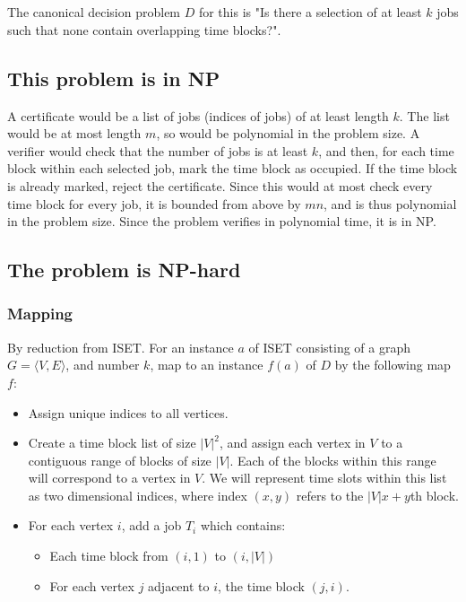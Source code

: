 \documentclass[11pt]{article}
\begin{document}
\section{}
The canonical decision problem $D$ for this is "Is there a selection of at least $k$ jobs such that none contain overlapping time blocks?". 

\subsection*{This problem is in NP}

A certificate would be a list of jobs (indices of jobs) of at least length $k$. The list would be at most length $m$, so would be polynomial in the problem size. A verifier would check that the number of jobs is at least $k$, and then, for each time block within each selected job, mark the time block as occupied. If the time block is already marked, reject the certificate. Since this would at most check every time block for every job, it is bounded from above by $mn$, and is thus polynomial in the problem size. Since the problem verifies in polynomial time, it is in NP.

\subsection*{The problem is NP-hard}

\subsubsection*{Mapping}
By reduction from ISET. For an instance $a$ of ISET consisting of a graph $G = \langle V,E \rangle$, and number $k$, map to an instance $f(a)$ of $D$ by the following map $f$:

\begin{itemize}
    \item Assign unique indices to all vertices. 
    \item Create a time block list of size $|V|^2$, and assign each vertex in $V$ to a contiguous range of blocks of size $|V|$. Each of the blocks within this range will correspond to a vertex in $V$. We will represent time slots within this list as two dimensional indices, where index $(x,y)$ refers to the $|V|x + y$th block.
    \item For each vertex $i$, add a job $T_i$ which contains: \begin{itemize}
        \item Each time block from $(i, 1)$ to $(i, |V|)$ 
        \item For each vertex $j$ adjacent to $i$, the time block $(j, i)$. 
    \end{itemize}
\end{itemize}
\end{document}

